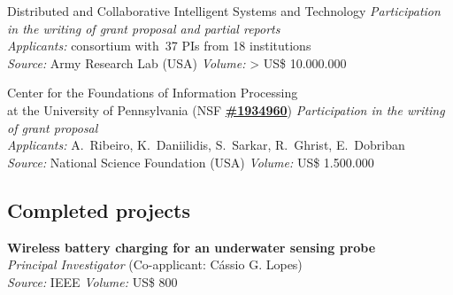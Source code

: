 \documentclass{cvlfoc}
\begin{document}
{\begin{entrydate}
		{Distributed and Collaborative Intelligent Systems and Technology}
		{}
		{\emph{Participation in the writing of grant proposal and partial reports}\\
		\emph{Applicants:} consortium with~37 PIs from 18 institutions\\
		\emph{Source:} Army Research Lab (USA) \hfill
			\emph{Volume:} > US\$ 10.000.000}

		{Center for the Foundations of Information Processing\\
			at the University of Pennsylvania
		{\normalfont (NSF \href{https://www.nsf.gov/awardsearch/showAward?AWD_ID=1934960}{\textbf{\#1934960}})}}
		{}
		{\emph{Participation in the writing of grant proposal}\\
		\emph{Applicants:} A.\ Ribeiro, K.\ Daniilidis, S.\ Sarkar,
			R.\ Ghrist, E.\ Dobriban\\
		\emph{Source:} National Science Foundation (USA) \hfill
			\emph{Volume:} US\$ 1.500.000}
\end{entrydate}



\subsection*{Completed projects}

\begin{entrydate}
		{\textbf{Wireless battery charging for an underwater sensing probe}\\
		\emph{Principal Investigator} (Co-applicant: C\'{a}ssio G. Lopes)\\
		\emph{Source:} IEEE \hfill \emph{Volume:} US\$ 800}
\end{entrydate}
}{}



\end{document}

